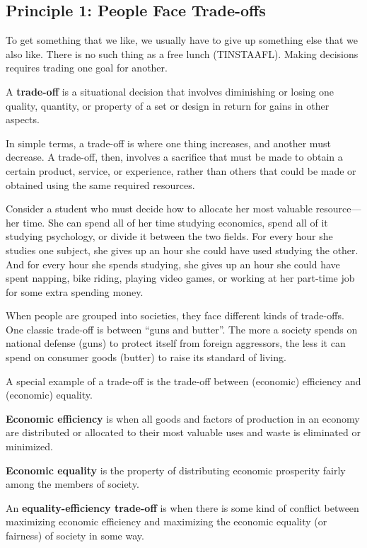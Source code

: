 \subsection*{Principle 1: People Face Trade-offs}

To get something that we like, we usually have to give up something else that we also like. There is no such thing as
a free lunch (TINSTAAFL). Making decisions requires trading one goal for another.

A \textbf{trade-off} is a situational decision that involves diminishing or losing one quality, quantity, or property
of a set or design in return for gains in other aspects.
\ed

In simple terms, a trade-off is where one thing increases, and another must decrease. A trade-off, then, involves a
sacrifice that must be made to obtain a certain product, service, or experience, rather than others that could be
made or obtained using the same required resources.

\be
Consider a student who must decide how to allocate her most valuable resource—her time. She can spend all of her time
studying economics, spend all of it studying psychology, or divide it between the two fields. For every hour she
studies one subject, she gives up an hour she could have used studying the other. And for every hour she spends
studying, she gives up an hour she could have spent napping, bike riding, playing video games, or working at her
part-time job for some extra spending money.
\ee

When people are grouped into societies, they face different kinds of trade-offs. \be One classic trade-off is between
``guns and butter''. The more a society spends on national defense (guns) to protect itself from foreign aggressors,
the less it can spend on consumer goods (butter) to raise its standard of living. \ee

A special example of a trade-off is the trade-off between (economic) efficiency and (economic) equality.

\textbf{Economic efficiency} is when all goods and factors of production in an economy are distributed or allocated
to their most valuable uses and waste is eliminated or minimized.
\ed

\textbf{Economic equality} is the property of distributing economic prosperity fairly among the members of society.
\ed

An \textbf{equality-efficiency trade-off } is when there is some kind of conflict between maximizing economic
efficiency and maximizing the economic equality (or fairness) of society in some way.
\ed

